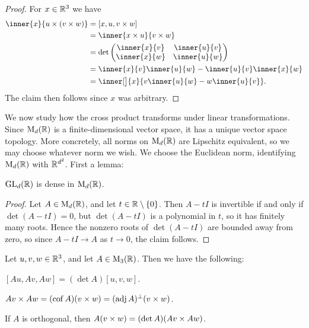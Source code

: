 \begin{proof}
    For $x \in \mathbb{R}^3$ we have
    \begin{align*}
        \inner{x}{u \crossp (v \crossp w)}
            &= [x, u, v \crossp w] \\
            &= \inner{x \crossp u}{v \crossp w} \\
            &= \det \begin{pmatrix}
                \inner{x}{v} & \inner{u}{v} \\
                \inner{x}{w} & \inner{u}{w}
            \end{pmatrix} \\
            &= \inner{x}{v} \inner{u}{w} - \inner{u}{v} \inner{x}{w} \\
            &= \inner[\big]{x}{ v\inner{u}{w} - w\inner{u}{v} }.
    \end{align*}
    The claim then follows since $x$ was arbitrary.
\end{proof}


We now study how the cross product transforms under linear transformations. Since $\mathrm{M}_{d}(\mathbb{R})$ is a finite-dimensional vector space, it has a unique vector space topology. More concretely, all norms on $\mathrm{M}_{d}(\mathbb{R})$ are Lipschitz equivalent, so we may choose whatever norm we wish. We choose the Euclidean norm, identifying $\mathrm{M}_{d}(\mathbb{R})$ with $\mathbb{R}^{d^2}$. First a lemma:

\begin{lemma}
    \label{lem:GL-density}
    $\mathrm{GL}_{d}(\mathbb{R})$ is dense in $\mathrm{M}_{d}(\mathbb{R})$.
\end{lemma}

\begin{proof}
    Let $A \in \mathrm{M}_{d}(\mathbb{R})$, and let $t \in \mathbb{R} \setminus \{0\}$. Then $A - tI$ is invertible if and only if $\det(A - tI) = 0$, but $\det(A - tI)$ is a polynomial in $t$, so it has finitely many roots. Hence the nonzero roots of $\det(A - tI)$ are bounded away from zero, so since $A - tI \to A$ as $t \to 0$, the claim follows.
\end{proof}


\begin{proposition}
    Let $u,v,w \in \mathbb{R}^3$, and let $A \in \mathrm{M}_{3}(\mathbb{R})$. Then we have the following:
    \begin{enumproposition}
        \item \label{enum:triple-product-transformation} $[Au, Av, Aw] = (\det A) [u,v,w]$.
        
        \item \label{enum:cross-product-transformation} $Av \times Aw = (\operatorname{cof} A)(v \times w) = (\operatorname{adj} A)^\bot (v \times w)$.

        \item \label{enum:cross-product-orthogonal-transformation} If $A$ is orthogonal, then $A(v \times w) = (\det A)(Av \times Aw)$.
    \end{enumproposition}
\end{proposition}

